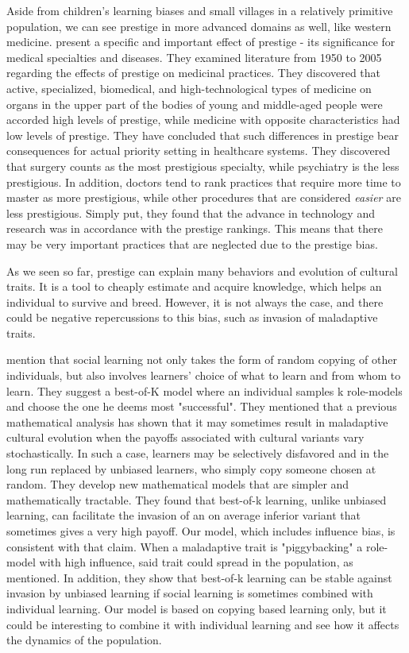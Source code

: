 \documentclass[12pt]{extarticle}
\begin{document}
Aside from children's learning biases and small villages in a relatively primitive population, we can see prestige in more advanced domains as well, like western medicine.\citet{medical_prestige} present a specific and important effect of prestige - its significance for medical specialties and diseases.
They examined literature from 1950 to 2005 regarding the effects of prestige on medicinal practices. They discovered that active, specialized, biomedical, and high-technological types of medicine on organs in the upper part of the bodies of young and middle-aged people were accorded high levels of prestige, while medicine with opposite characteristics had low levels of prestige. They have concluded that such differences in prestige bear consequences for actual priority setting in healthcare systems. They discovered that surgery counts as the most prestigious specialty, while psychiatry is the less prestigious. In addition, doctors tend to rank practices that require more time to master as more prestigious, while other procedures that are considered \textit{easier} are less prestigious. Simply put, they found that the advance in technology and research was in accordance with the prestige rankings.
This means that there may be very important practices that are neglected due to the prestige bias.

As we seen so far, prestige can explain many behaviors and evolution of cultural traits. It is a tool to cheaply estimate and acquire knowledge, which helps an individual to survive and breed. However, it is not always the case, and there could be negative repercussions to this bias, such as invasion of maladaptive traits.

\citet{best_of_k} mention that social learning not only takes the form of random copying of other individuals, but also involves learners’ choice of what to learn and from whom to learn. They suggest a best-of-K model where an individual samples k role-models and choose the one he deems most "successful". They mentioned that a previous mathematical analysis has shown that it may sometimes result in maladaptive cultural evolution when the payoffs associated with cultural variants vary stochastically. In such a case, learners may be selectively disfavored and in the long run replaced by unbiased learners, who simply copy someone chosen at random. They develop new mathematical models that are simpler and mathematically tractable. They found that best-of-k learning, unlike unbiased learning, can facilitate the invasion of an on average inferior variant that sometimes gives a very high payoff. Our model, which includes influence bias, is consistent with that claim. When a maladaptive trait is "piggybacking" a role-model with high influence, said trait could spread in the population, as mentioned. In addition, they show that best-of-k learning can be stable against invasion by unbiased learning if social learning is sometimes combined with individual learning. Our model is based on copying based learning only, but it could be interesting to combine it with individual learning and see how it affects the dynamics of the population.
\end{document}
